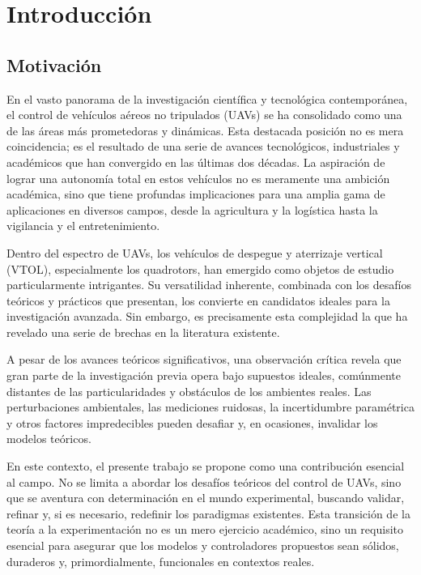 
\chapter{Introducción}
\setcounter{page}{1}
\renewcommand{\thepage}{\arabic{page}}


\section{Motivación}
En el vasto panorama de la investigación científica y tecnológica contemporánea, el control de vehículos aéreos no tripulados (UAVs) se ha consolidado como una de las áreas más prometedoras y dinámicas. Esta destacada posición no es mera coincidencia; es el resultado de una serie de avances tecnológicos, industriales y académicos que han convergido en las últimas dos décadas. La aspiración de lograr una autonomía total en estos vehículos no es meramente una ambición académica, sino que tiene profundas implicaciones para una amplia gama de aplicaciones en diversos campos, desde la agricultura y la logística hasta la vigilancia y el entretenimiento.

Dentro del espectro de UAVs, los vehículos de despegue y aterrizaje vertical (VTOL), especialmente los quadrotors, han emergido como objetos de estudio particularmente intrigantes. Su versatilidad inherente, combinada con los desafíos teóricos y prácticos que presentan, los convierte en candidatos ideales para la investigación avanzada. Sin embargo, es precisamente esta complejidad la que ha revelado una serie de brechas en la literatura existente.

A pesar de los avances teóricos significativos, una observación crítica revela que gran parte de la investigación previa opera bajo supuestos ideales, comúnmente distantes de las particularidades y obstáculos de los ambientes reales. Las perturbaciones ambientales, las mediciones ruidosas, la incertidumbre paramétrica y otros factores impredecibles pueden desafiar y, en ocasiones, invalidar los modelos teóricos.

En este contexto, el presente trabajo se propone como una contribución esencial al campo. No se limita a abordar los desafíos teóricos del control de UAVs, sino que se aventura con determinación en el mundo experimental, buscando validar, refinar y, si es necesario, redefinir los paradigmas existentes. Esta transición de la teoría a la experimentación no es un mero ejercicio académico, sino un requisito esencial para asegurar que los modelos y controladores propuestos sean sólidos, duraderos y, primordialmente, funcionales en contextos reales.


